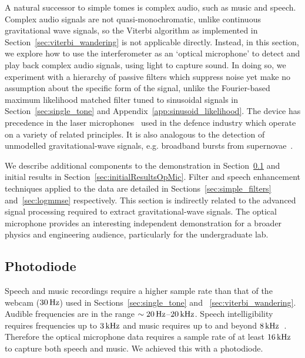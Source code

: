 \documentclass[paper-main.tex]{subfiles}
\begin{document}
A natural successor to simple tomes is complex audio, such as music and speech. 
Complex audio signals are not quasi-monochromatic, unlike continuous gravitational wave signals, so the Viterbi algorithm as implemented in Section~\ref{sec:viterbi_wandering} is not applicable directly.
Instead, in this section, we explore how to use the interferometer as an `optical microphone' to detect and play back complex audio signals, using light to capture sound. 
In doing so, we experiment with a hierarchy of passive filters which suppress noise yet make no assumption about the specific form of the signal, unlike the Fourier-based maximum likelihood matched filter tuned to sinusoidal signals in Section~\ref{sec:single_tone} and Appendix~\ref{app:sinusoid_likelihood}. 
The device has precedence in the laser microphones~\cite{laser_microphone} used in the defence industry which operate on a variety of related principles.
It is also analogous to the detection of unmodelled gravitational-wave signals, e.g. broadband bursts from supernovae~\cite{}. 


We describe additional components to the demonstration in Section~\ref{sec:photodiode} and initial results in Section~\ref{sec:initialResultsOpMic}.
Filter and speech enhancement techniques applied to the data are detailed in Sections~\ref{sec:simple_filters} and~\ref{sec:logmmse} respectively.
This section is indirectly related to the advanced signal processing required to extract gravitational-wave signals. 
The optical microphone provides an interesting independent demonstration for a broader physics and engineering audience, particularly for the undergraduate lab. 



\subsection{Photodiode}
\label{sec:photodiode}

Speech and music recordings require a higher sample rate than that of the webcam ($30\,{\rm Hz}$) used in Sections~\ref{sec:single_tone} and ~\ref{sec:viterbi_wandering}. 
Audible frequencies are in the range $\sim 20\,{\rm Hz}$--$20\,{\rm kHz}$. 
Speech intelligibility requires frequencies up to $3\,{\rm kHz}$ and music requires up to and beyond $8\,{\rm kHz}$~\cite{speech_intelligibility}. 
Therefore the optical microphone data requires a sample rate of at least $16\,{\rm kHz}$ to capture both speech and music. 
We achieved this with a photodiode.
\end{document}
